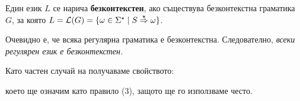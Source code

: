 Един език $L$ се нарича {\bf безконтекстен}, ако съществува безконтекстна граматика $G$, за която 
$L = \L(G) = \{\omega \in \Sigma^\star \mid S \derive{\star} \omega\}$.

\begin{remark}
  Очевидно е, че всяка регулярна граматика е безконтекстна. Следователно, 
  {\em всеки регулярен език е безконтекстен.}
\end{remark}

\begin{remark}
  Като частен случай на  получаваме свойството:
  \begin{prooftree}
  \end{prooftree}
  което ще означим като правило (3), защото ще го използваме често.
\end{remark}

